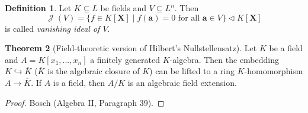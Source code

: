 \documentclass[12pt,a4paper]{report}
\theoremstyle{definition}
\newtheorem{theorem}{Theorem}[chapter] %
\newtheorem{defn}[theorem]{Definition}
\theoremstyle{num.custom-title}
\DeclareMathOperator{\J}{\mathcal{J}}
\DeclareMathOperator{\sse}{\subseteq}
\newcommand{\ol}{\overline}
\newcommand{\X}{\mathbf{X}}
\begin{document}
\begin{defn}
Let $K \sse L$ be fields and $V \sse L^n$. Then
\[
\J(V) = \{ f \in K[\X] \mid f(\mathbf{a}) = 0 \text{ for all } \mathbf{a} \in V \} \lhd K[\X]
\]
is called \emph{vanishing ideal of $V$}.
\end{defn}

\begin{theorem}[Field-theoretic version of Hilbert's Nullstellensatz]
Let $K$ be a field and $A=K[x_1,...,x_n]$ a finitely generated $K$-algebra. Then the embedding $K \hookrightarrow \ol{K}$ ($\ol{K}$ is the algebraic closure of $K$) can be lifted to a ring $K$-homomorphism $A \to \ol{K}$. If $A$ is a field, then $A/K$ is an algebraic field extension.
\begin{proof}
Bosch (Algebra II, Paragraph 39).
\end{proof}
\end{theorem}
\end{document}
